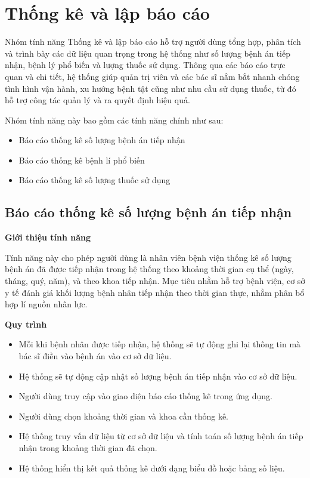 \section{Thống kê và lập báo cáo}

Nhóm tính năng Thống kê và lập báo cáo hỗ trợ người dùng tổng hợp, phân tích và trình bày các dữ liệu quan trọng trong hệ thống như số lượng bệnh án tiếp nhận, bệnh lý phổ biến và lượng thuốc sử dụng. Thông qua các báo cáo trực quan và chi tiết, hệ thống giúp quản trị viên và các bác sĩ nắm bắt nhanh chóng tình hình vận hành, xu hướng bệnh tật cũng như nhu cầu sử dụng thuốc, từ đó hỗ trợ công tác quản lý và ra quyết định hiệu quả.

Nhóm tính năng này bao gồm các tính năng chính như sau:
\begin{itemize}
    \item Báo cáo thống kê số lượng bệnh án tiếp nhận
    \item Báo cáo thống kê bệnh lí phổ biến
    \item Báo cáo thống kê số lượng thuốc sử dụng
\end{itemize}

\subsection{Báo cáo thống kê số lượng bệnh án tiếp nhận}

\noindent \textbf{Giới thiệu tính năng}

Tính năng này cho phép người dùng là nhân viên bệnh viện thống kê số lượng bệnh án đã được tiếp nhận trong hệ thống theo khoảng thời gian cụ thể (ngày, tháng, quý, năm), và theo khoa tiếp nhận. Mục tiêu nhằm hỗ trợ bệnh viện, cơ sở y tế đánh giá khối lượng bệnh nhân tiếp nhận theo thời gian thực, nhằm phân bổ hợp lí nguồn nhân lực.

\noindent \textbf{Quy trình}

\begin{itemize}
    \item Mỗi khi bệnh nhân được tiếp nhận, hệ thống sẽ tự động ghi lại thông tin mà bác sĩ điền vào bệnh án vào cơ sở dữ liệu.
    \item Hệ thống sẽ tự động cập nhật số lượng bệnh án tiếp nhận vào cơ sở dữ liệu.
    \item Người dùng truy cập vào giao diện báo cáo thống kê trong ứng dụng.
    \item Người dùng chọn khoảng thời gian và khoa cần thống kê.
    \item Hệ thống truy vấn dữ liệu từ cơ sở dữ liệu và tính toán số lượng bệnh án tiếp nhận trong khoảng thời gian đã chọn.
    \item Hệ thống hiển thị kết quả thống kê dưới dạng biểu đồ hoặc bảng số liệu.
\end{itemize}

